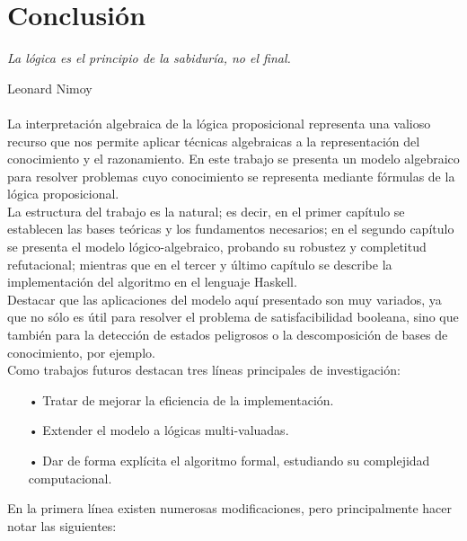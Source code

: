 \chapter*{Conclusión}

\hfil \textit{La lógica es el principio de la sabiduría, no el final.}

\hfil \hfil \hfil Leonard Nimoy \\\\

La interpretación algebraica de la lógica proposicional representa una valioso recurso que nos permite aplicar técnicas algebraicas a la representación del conocimiento y el razonamiento. En este trabajo se presenta un modelo algebraico para resolver problemas cuyo conocimiento se representa mediante fórmulas de la lógica proposicional.\\

La estructura del trabajo es la natural; es decir, en el primer capítulo se establecen las bases teóricas y los fundamentos necesarios; en el segundo capítulo se presenta el modelo lógico-algebraico, probando su robustez y completitud refutacional; mientras que en el tercer y último capítulo se describe la implementación del algoritmo en el lenguaje Haskell.\\

Destacar que las aplicaciones del modelo aquí presentado son muy variados, ya que no sólo es útil para resolver el problema de satisfacibilidad booleana, sino que también para la detección de estados peligrosos o la descomposición de bases de conocimiento, por ejemplo.\\

Como trabajos futuros destacan tres líneas principales de investigación:

\begin{itemize}
\item[•] Tratar de mejorar la eficiencia de la implementación.
\item[•] Extender el modelo a lógicas multi-valuadas.
\item[•] Dar de forma explícita el algoritmo formal, estudiando su complejidad computacional.
\end{itemize}

En la primera línea existen numerosas modificaciones, pero principalmente hacer notar las siguientes:

